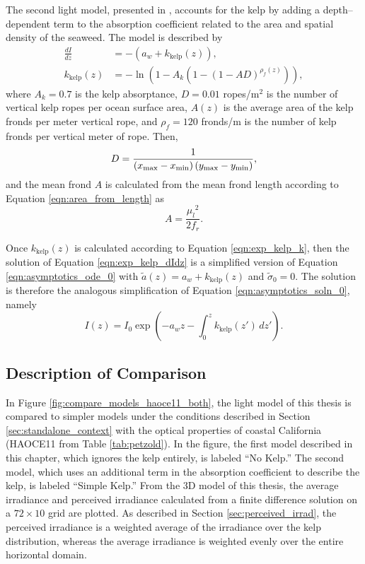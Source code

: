 The second light model, presented in \citep{broch_modelling_2012}, accounts for the kelp by adding a depth--dependent term to the absorption coefficient related to the area and spatial density of the seaweed.
The model is described by
\begin{align}
  \frac{dI}{dz} &= -\left(a_w + k_{\mbox{kelp}}(z)\right),
  \label{eqn:exp_kelp_dIdz}\\
  k_{\mbox{kelp}}(z) &= -\ln(1-A_k(1-(1-AD)^{\rho_f(z)})),
  \label{eqn:exp_kelp_k}
\end{align}
where $A_k=0.7$ is the kelp absorptance, $D=0.01$ ropes/m$^2$ is the number of vertical kelp ropes per ocean surface area, $A(z)$ is the average area of the kelp fronds per meter vertical rope, and $\rho_f=120$ fronds/m is the number of kelp fronds per vertical meter of rope.
Then,
\begin{equation}
  D = \frac{1}{\left({x_{\max}}-{x_{\min}}\right) \left({y_{\max}}-{y_{\min}}\right)},
\end{equation}
and the mean frond $A$ is calculated from the mean frond length according to Equation \eqref{eqn:area_from_length} as
\begin{equation}
  A = \frac{{\mu_l}^2}{2f_r}.
\end{equation}

Once $k_{\mbox{kelp}}(z)$ is calculated according to Equation \eqref{eqn:exp_kelp_k}, then the solution of Equation \eqref{eqn:exp_kelp_dIdz} is a simplified version of Equation \eqref{eqn:asymptotics_ode_0} with $\tilde{a}(z)=a_w+k_{\mbox{kelp}}(z)$ and $\tilde{\sigma}_0=0$.
The solution is therefore the analogous simplification of Equation \eqref{eqn:asymptotics_soln_0}, namely
\begin{equation}
  I(z) = I_0 \exp\left(-a_wz - \int_0^z k_{\mbox{kelp}}(z')\, dz' \right).
\end{equation}

\subsection{Description of Comparison}
In Figure \ref{fig:compare_models_haoce11_both}, the light model of this thesis is compared to simpler models under the conditions described in Section \ref{sec:standalone_context} with the optical properties of coastal California (HAOCE11 from Table \ref{tab:petzold}).
In the figure, the first model described in this chapter, which ignores the kelp entirely, is labeled ``No Kelp.''
The second model, which uses an additional term in the absorption coefficient to describe the kelp, is labeled ``Simple Kelp.''
From the 3D model of this thesis, the average irradiance and perceived irradiance calculated from a finite difference solution on a $72\times10$ grid are plotted.
As described in Section \ref{sec:perceived_irrad}, the perceived irradiance is a weighted average of the irradiance over the kelp distribution, whereas the average irradiance is weighted evenly over the entire horizontal domain.

